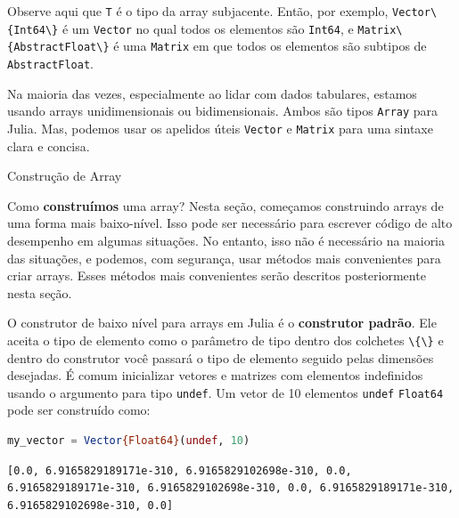 \documentclass[
  notoc %
]{tufte-book}
\makeatletter
\newcommand{\passthrough}[1]{#1}
\renewcommand\subsubsection{%
\@startsection{subsubsection}{3}{\z@ }{-3.25ex\@plus -1ex \@minus -.2ex}{1.5ex \@plus .2ex}{\normalfont \normalsize \bfseries }
}
\makeatother
\begin{document}
Observe aqui que \passthrough{\lstinline!T!} é o tipo da array
subjacente. Então, por exemplo,
\passthrough{\lstinline!Vector\{Int64\}!} é um
\passthrough{\lstinline!Vector!} no qual todos os elementos são
\passthrough{\lstinline!Int64!}, e
\passthrough{\lstinline!Matrix\{AbstractFloat\}!} é uma
\passthrough{\lstinline!Matrix!} em que todos os elementos são subtipos
de \passthrough{\lstinline!AbstractFloat!}.

Na maioria das vezes, especialmente ao lidar com dados tabulares,
estamos usando arrays unidimensionais ou bidimensionais. Ambos são tipos
\passthrough{\lstinline!Array!} para Julia. Mas, podemos usar os
apelidos úteis \passthrough{\lstinline!Vector!} e
\passthrough{\lstinline!Matrix!} para uma sintaxe clara e concisa.

\hypertarget{sec:array_construction}{%
\subsubsection{Construção de Array}\label{sec:array_construction}}

Como \textbf{construímos} uma array? Nesta seção, começamos construindo
arrays de uma forma mais baixo-nível. Isso pode ser necessário para
escrever código de alto desempenho em algumas situações. No entanto,
isso não é necessário na maioria das situações, e podemos, com
segurança, usar métodos mais convenientes para criar arrays. Esses
métodos mais convenientes serão descritos posteriormente nesta seção.

O construtor de baixo nível para arrays em Julia é o \textbf{construtor
padrão}. Ele aceita o tipo de elemento como o parâmetro de tipo dentro
dos colchetes \passthrough{\lstinline!\{\}!} e dentro do construtor você
passará o tipo de elemento seguido pelas dimensões desejadas. É comum
inicializar vetores e matrizes com elementos indefinidos usando o
argumento para tipo \passthrough{\lstinline!undef!}. Um vetor de 10
elementos \passthrough{\lstinline!undef!}
\passthrough{\lstinline!Float64!} pode ser construído como:

\begin{lstlisting}[language=Julia]
my_vector = Vector{Float64}(undef, 10)
\end{lstlisting}

\begin{lstlisting}[language=Output]
[0.0, 6.9165829189171e-310, 6.9165829102698e-310, 0.0, 6.9165829189171e-310, 6.9165829102698e-310, 0.0, 6.9165829189171e-310, 6.9165829102698e-310, 0.0]
\end{lstlisting}
\end{document}
